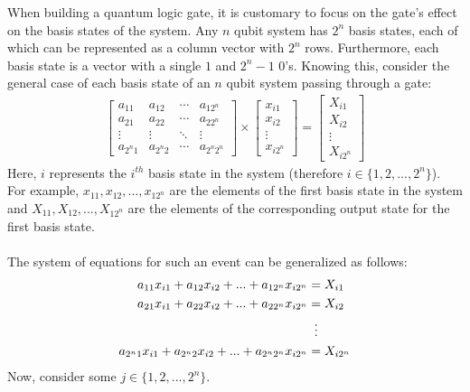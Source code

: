 \documentclass{article}
\begin{document}
When building a quantum logic gate, it is customary to focus on the gate's effect on the basis states of the system.
Any $n$ qubit system has $2^{n}$ basis states, each of which can be represented as a column vector with $2^{n}$ rows.
Furthermore, each basis state is a vector with a single $1$ and $2^{n} - 1$ $0$'s.
Knowing this, consider the general case of each basis state of an $n$ qubit system passing through a gate:
\begin{align*}
		\begin{bmatrix}
			a_{11} & a_{12} & \cdots & a_{12^{n}} \\
			a_{21} & a_{22} & \cdots & a_{22^{n}} \\
			\vdots & \vdots & \ddots & \vdots \\
			a_{2^{n}1} & a_{2^{n}2} & \cdots & a_{2^{n}2^{n}}
		\end{bmatrix}
		\times
		\begin{bmatrix}
			x_{i1} \\
			x_{i2} \\
			\vdots \\
			x_{i2^{n}}
		\end{bmatrix}
		=
		\begin{bmatrix}
			X_{i1} \\
			X_{i2} \\
			\vdots \\
			X_{i2^{n}}
		\end{bmatrix}
\end{align*}
Here, $i$ represents the $i^{th}$ basis state in the system (therefore $i \in \{1, 2, ..., 2^{n}\}$). 
For example, $x_{11}, x_{12}, ..., x_{12^{n}}$ are the elements of the first basis state in the system and
$X_{11}, X_{12}, ..., X_{12^{n}}$ are the elements of the corresponding output state for the first basis state.\\\\
The system of equations for such an event can be generalized as follows:
\begin{align*}
	a_{11}x_{i1} + a_{12}x_{i2} + ... + a_{12^{n}}x_{i2^{n}} &= X_{i1} \\
	a_{21}x_{i1} + a_{22}x_{i2} + ... + a_{22^{n}}x_{i2^{n}} &= X_{i2} \\
	&\mathrel{\makebox[\widthof{=}]{\vdots}} \\
	a_{2^{n}1}x_{i1} + a_{2^{n}2}x_{i2} + ... + a_{2^{n}2^{n}}x_{i2^{n}} &= X_{i2^{n}}	
\end{align*}
Now, consider some $j \in \{1, 2, ..., 2^{n}\}$. 
\end{document}
